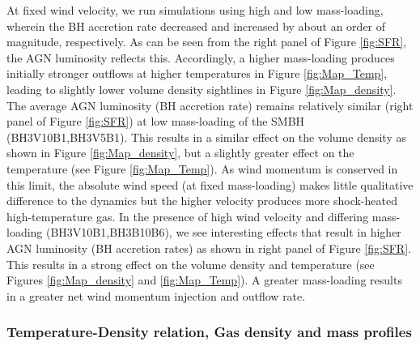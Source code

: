 \documentclass[fleqn,usenatbib]{mnras}
\begin{document}
At fixed wind velocity, we run simulations using high and low mass-loading, wherein the BH accretion rate decreased and increased by about an order of magnitude, respectively. As can be seen from the right panel of Figure \ref{fig:SFR}, the AGN luminosity reflects this.
Accordingly, a higher mass-loading produces initially stronger outflows at higher temperatures in Figure \ref{fig:Map_Temp}, leading to slightly lower volume density sightlines in Figure \ref{fig:Map_density}.
The average AGN luminosity (BH accretion rate) remains relatively similar (right panel of Figure \ref{fig:SFR}) at low mass-loading of the SMBH (BH3V10B1,BH3V5B1). This results in a similar effect on the volume density as shown in  Figure \ref{fig:Map_density}, but a slightly greater effect on the temperature (see Figure \ref{fig:Map_Temp}). As wind momentum is conserved in this limit, the absolute wind speed (at fixed mass-loading) makes little qualitative difference to the dynamics but the higher velocity produces more shock-heated high-temperature gas. 
In the presence of high wind velocity and differing mass-loading (BH3V10B1,BH3B10B6), we see interesting effects that result in higher AGN luminosity (BH accretion rates) as shown in right panel of Figure \ref{fig:SFR}. This results in a strong effect on the volume density and temperature (see Figures \ref{fig:Map_density} and \ref{fig:Map_Temp}).
A greater mass-loading results in a greater net wind momentum injection and outflow rate.

\subsubsection{Temperature-Density relation, Gas density and mass profiles}
   
\end{document}
